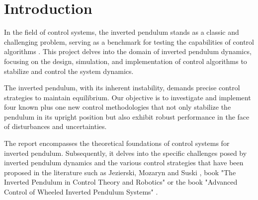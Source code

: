 \chapter*{Introduction}
\label{Introduction}

In the field of control systems, the inverted pendulum stands as a classic and challenging problem, serving as a benchmark for testing the capabilities of control algorithms \cite{HAMZA2019347}. This project delves into the domain of inverted pendulum dynamics, focusing on the design, simulation, and implementation of control algorithms to stabilize and control the system dynamics.

The inverted pendulum, with its inherent instability, demands precise control strategies to maintain equilibrium. Our objective is to investigate and implement four known plus one new control methodologies that not only stabilize the pendulum in its upright position but also exhibit robust performance in the face of disturbances and uncertainties.

The report encompasses the theoretical foundations of control systems for inverted pendulum. Subsequently, it delves into the specific challenges posed by inverted pendulum dynamics and the various control strategies that have been proposed in the literature such as Jezierski, Mozaryn and Suski \cite{LQRvsMPC}, book "The Inverted Pendulum in Control Theory and Robotics" \cite{bookInverted} or the book "Advanced Control of Wheeled Inverted Pendulum Systems" \cite{controlInverted}.

